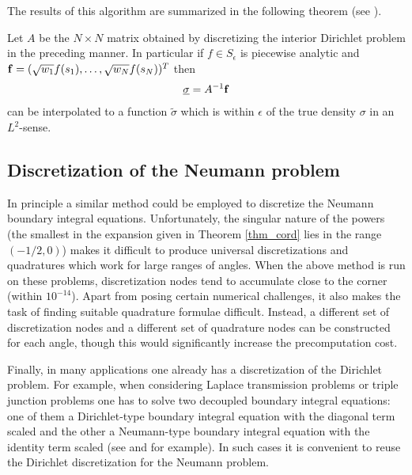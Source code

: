 The results of this algorithm are summarized in the following theorem (see \cite{}).
\begin{theorem}
Let $A$ be the $N\times N$ matrix obtained by discretizing the interior Dirichlet problem in the preceding manner. In particular if $f \in S_\epsilon $ is piecewise analytic and ${\bf f} = (\sqrt{w_1}f(s_1),\dots,\sqrt{w_N}f(s_N))^T$ then
\begin{align}
\underline{\bf \sigma} = A^{-1} {\bf f}
\end{align}
can be interpolated to a function $\tilde{\sigma}$ which is within $\epsilon$ of the true density $\sigma$ in an $L^2$-sense. 
\end{theorem}


\subsection{Discretization of the Neumann problem}
In principle a similar method could be employed to discretize the Neumann boundary integral equations. Unfortunately, the singular nature of the powers (the smallest in the expansion given in Theorem \ref{thm_cord} lies in the range $(-1/2,0)$) makes it difficult to produce universal discretizations and quadratures which work for large ranges of angles. When the above method is run on these problems, discretization nodes tend to accumulate close to the corner (within $10^{-14}$). Apart from posing certain numerical challenges, it also makes the task of finding suitable quadrature formulae difficult. Instead, a different set of discretization nodes and a different set of quadrature nodes can be constructed for each angle, though this would significantly increase the precomputation cost.

Finally, in many applications one already has a discretization of the Dirichlet problem. For example, when considering Laplace transmission problems or triple junction problems one has to solve two decoupled boundary integral equations: one of them a Dirichlet-type boundary integral equation with the diagonal term scaled and the other a Neumann-type boundary integral equation with the identity term scaled (see \cite{hoskins2018numerical} and \cite{hoskins2019solution} for example). In such cases it is convenient to reuse the Dirichlet discretization for the Neumann problem.  
